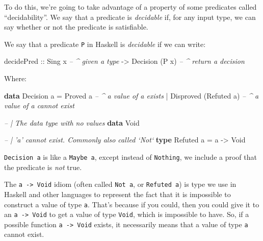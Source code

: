 \documentclass[]{article}
\newenvironment{Shaded}{}{}
\newcommand{\CommentTok}[1]{\textcolor[rgb]{0.38,0.63,0.69}{\textit{#1}}}
\newcommand{\DataTypeTok}[1]{\textcolor[rgb]{0.56,0.13,0.00}{#1}}
\newcommand{\FunctionTok}[1]{\textcolor[rgb]{0.02,0.16,0.49}{#1}}
\newcommand{\KeywordTok}[1]{\textcolor[rgb]{0.00,0.44,0.13}{\textbf{#1}}}
\newcommand{\NormalTok}[1]{#1}
\newcommand{\OtherTok}[1]{\textcolor[rgb]{0.00,0.44,0.13}{#1}}
\begin{document}
To do this, we're going to take advantage of a property of some predicates
called ``decidability''. We say that a predicate is \emph{decidable} if, for any
input type, we can say whether or not the predicate is satisfiable.

We say that a predicate \texttt{P} in Haskell is \emph{decidable} if we can
write:

\begin{Shaded}
\begin{Highlighting}[]
\NormalTok{decidePred}
\OtherTok{    ::} \DataTypeTok{Sing}\NormalTok{ x               }\CommentTok{-- ^ given a type}
    \OtherTok{->} \DataTypeTok{Decision}\NormalTok{ (}\DataTypeTok{P}\NormalTok{ x)       }\CommentTok{-- ^ return a decision}
\end{Highlighting}
\end{Shaded}

Where:

\begin{Shaded}
\begin{Highlighting}[]
\KeywordTok{data} \DataTypeTok{Decision}\NormalTok{ a }\FunctionTok{=} \DataTypeTok{Proved}\NormalTok{ a                  }\CommentTok{-- ^ a value of a exists}
                \FunctionTok{|} \DataTypeTok{Disproved}\NormalTok{ (}\DataTypeTok{Refuted}\NormalTok{ a)     }\CommentTok{-- ^ a value of a cannot exist}

\CommentTok{-- | The data type with no values}
\KeywordTok{data} \DataTypeTok{Void}

\CommentTok{-- | 'a' cannot exist.  Commonly also called `Not`}
\KeywordTok{type} \DataTypeTok{Refuted}\NormalTok{ a }\FunctionTok{=}\NormalTok{ a }\OtherTok{->} \DataTypeTok{Void}
\end{Highlighting}
\end{Shaded}

\texttt{Decision\ a} is like a \texttt{Maybe\ a}, except instead of
\texttt{Nothing}, we include a proof that the predicate is \emph{not} true.

The \texttt{a\ -\textgreater{}\ Void} idiom (often called \texttt{Not\ a}, or
\texttt{Refuted\ a}) is type we use in Haskell and other languages to represent
the fact that it is impossible to construct a value of type \texttt{a}. That's
because if you could, then you could give it to an
\texttt{a\ -\textgreater{}\ Void} to get a value of type \texttt{Void}, which is
impossible to have. So, if a possible function \texttt{a\ -\textgreater{}\ Void}
exists, it necessarily means that a value of type \texttt{a} cannot exist.
\end{document}
